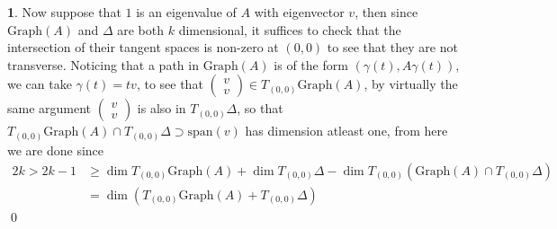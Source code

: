 \documentclass[10.5pt]{article}
\theoremstyle{definition}
\newtheorem{pb}{}
\begin{document}
\begin{pb}
        Now suppose that \(1\) is an eigenvalue of \(A\) with eigenvector \(v\), then since \(\text{Graph}(A)\) and \(\Delta\) are both \(k\) dimensional, it suffices to check that the intersection of their tangent spaces is non-zero at \((0,0)\) to see that they are not transverse. Noticing that a path in \(\text{Graph}(A)\) is of the form \((\gamma(t),A\gamma(t))\), we can take \(\gamma(t) = tv\), to see that \(\begin{pmatrix} v \\ v \end{pmatrix} \in T_{(0,0)}\text{Graph}(A)\), by virtually the same argument \(\begin{pmatrix} v \\ v \end{pmatrix}\) is also in \(T_{(0,0)}\Delta\), so that \(T_{(0,0)}\text{Graph}(A) \cap T_{(0,0)}\Delta \supset \text{span}(v)\) has dimension atleast one, from here we are done since
        \begin{align*}
            2k > 2k-1 &\geq \dim T_{(0,0)}\text{Graph}(A) + \dim T_{(0,0)}\Delta - \dim T_{(0,0)}(\text{Graph}(A) \cap T_{(0,0)}\Delta) \\ &= \dim (T_{(0,0)}\text{Graph}(A) +  T_{(0,0)}\Delta)
        \end{align*} \qed
    \end{pb}
\end{document}
